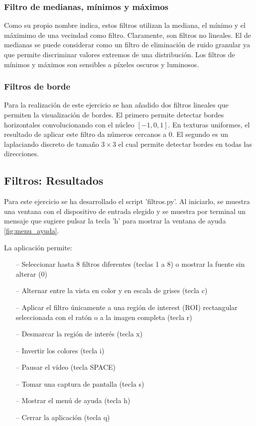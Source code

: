 \documentclass[12pt]{article}
\begin{document}
\subsubsection{Filtro de medianas, mínimos y máximos}

Como su propio nombre indica, estos filtros utilizan la mediana, el mínimo y el máximimo de una vecindad como filtro.
Claramente, son filtros no lineales. El de medianas se puede considerar como un filtro de eliminación de ruido granular ya que permite discriminar valores extremos de una distribución.
Los filtros de mínimos y máximos son sensibles a píxeles oscuros y luminosos.

\subsubsection{Filtros de borde}
Para la realización de este ejercicio se han añadido dos filtros lineales que permiten la visualización de bordes.
El primero permite detectar bordes horizontales convolucionando con el núcleo $[-1,0,1]$. En texturas uniformes, el resultado de aplicar este filtro da números cercanos a 0.
El segundo es un laplaciando discreto de tamaño $3\times 3$ el cual permite detectar bordes en todas las direcciones.

\subsection{Filtros: Resultados}
Para este ejercicio se ha desarrollado el script 'filtros.py'. 
Al iniciarlo, se muestra una ventana con el dispositivo de entrada elegido y se muestra por terminal un mensaje que sugiere pulsar la tecla 'h' para mostrar la ventana de ayuda \ref{fig:menu_ayuda}.

La aplicación permite:
\begin{itemize}
    \item[--] Seleccionar hasta 8 filtros diferentes (teclas 1 a 8) o mostrar la fuente sin alterar (0)
    \item[--] Alternar entre la vista en color y en escala de grises (tecla c)
    \item[--] Aplicar el filtro únicamente a una región de interest (ROI) rectangular seleccionada con el ratón o a la imagen completa (tecla r)
    \item[--] Desmarcar la región de interés (tecla x)
    \item[--] Invertir los colores (tecla i)
    \item[--] Pausar el vídeo (tecla SPACE)
    \item[--] Tomar una captura de pantalla (tecla s)
    \item[--] Mostrar el menú de ayuda (tecla h)
    \item[--] Cerrar la aplicación (tecla q)
\end{itemize}
\end{document}
